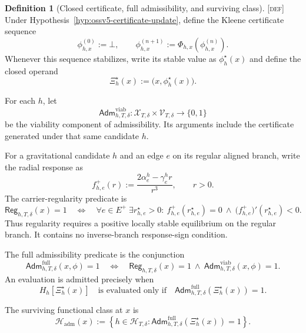 \documentclass[11pt]{article}
\newcommand{\Defn}{\textsc{[def]}}
\theoremstyle{definition}
\newtheorem{definition}{Definition}[section]
\begin{document}
\begin{definition}[Closed certificate, full admissibility, and surviving class]
\label{def:ossv5-admissibility}
\Defn{} Under Hypothesis~\ref{hyp:ossv5-certificate-update}, define the
Kleene certificate sequence
\begin{equation}
\phi^{(0)}_{h,x}:=\bot,
\qquad
\phi^{(n+1)}_{h,x}:=\Phi_{h,x}\!\left(\phi^{(n)}_{h,x}\right).
\label{eq:ossv5-kleene-sequence}
\end{equation}
Whenever this sequence stabilizes, write its stable value as
$\phi_h^\star(x)$ and define the closed operand
\begin{equation}
\Xi_h^\star(x):=\bigl(x,\phi_h^\star(x)\bigr).
\label{eq:ossv5-closed-operand}
\end{equation}

For each $h$, let
\begin{equation}
\mathsf{Adm}^{\mathrm{viab}}_{h,T,\delta}:
\mathcal X_{T,\delta}\times\mathcal V_{T,\delta}
\longrightarrow\{0,1\}
\label{eq:ossv5-viability-admissibility}
\end{equation}
be the viability component of admissibility.  Its arguments include the
certificate generated under that same candidate $h$.

For a gravitational candidate $h$ and an edge $e$ on its regular aligned
branch, write the radial response as
\begin{equation}
f^+_{h,e}(r):=
\frac{2\alpha_e^h-\gamma_e^h r}{r^3},
\qquad r>0.
\label{eq:ossv5-regular-response}
\end{equation}
The carrier-regularity predicate is
\begin{equation}
\mathsf{Reg}_{h,T,\delta}(x)=1
\quad\Longleftrightarrow\quad
\forall e\in E^+\;\exists r^\star_{h,e}>0:\
 f^+_{h,e}(r^\star_{h,e})=0
\ \wedge\
 \bigl(f^+_{h,e}\bigr)'(r^\star_{h,e})<0.
\label{eq:ossv5-carrier-regularity}
\end{equation}
Thus regularity requires a positive locally stable equilibrium on the regular
branch.  It contains no inverse-branch response-sign condition.

The full admissibility predicate is the conjunction
\begin{equation}
\mathsf{Adm}^{\mathrm{full}}_{h,T,\delta}(x,\phi)=1
\quad\Longleftrightarrow\quad
\mathsf{Reg}_{h,T,\delta}(x)=1
\ \wedge\
\mathsf{Adm}^{\mathrm{viab}}_{h,T,\delta}(x,\phi)=1.
\label{eq:ossv5-full-admissibility}
\end{equation}
An evaluation is admitted precisely when
\begin{equation}
H_h\!\left[\Xi_h^\star(x)\right]
\quad\text{is evaluated only if}\quad
\mathsf{Adm}^{\mathrm{full}}_{h,T,\delta}\!\left(\Xi_h^\star(x)\right)=1.
\label{eq:ossv5-admitted-evaluation}
\end{equation}

The surviving functional class at $x$ is
\begin{equation}
\mathcal H_{\mathrm{adm}}(x):=
\left\{
 h\in\mathcal H_{T,\delta}:
 \mathsf{Adm}^{\mathrm{full}}_{h,T,\delta}\!\left(\Xi_h^\star(x)\right)=1
\right\}.
\label{eq:ossv5-surviving-class}
\end{equation}
\end{definition}
\end{document}
